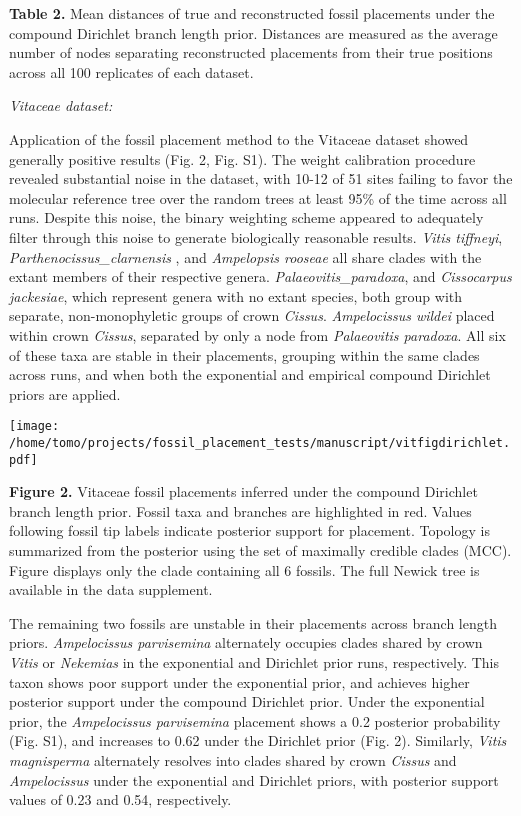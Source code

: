 \documentclass[12pt]{article}
\begin{document}
\textbf{Table 2.} Mean distances of true and reconstructed fossil
placements under the compound Dirichlet branch length prior. Distances are measured as the average number of nodes
separating reconstructed placements from their true positions across all
100 replicates of each dataset.

\noindent\emph{Vitaceae dataset:}

Application of the fossil placement method to the Vitaceae dataset
showed generally positive results (Fig. 2, Fig. S1). The weight calibration procedure
revealed substantial noise in the dataset, with 10-12 of 51 sites
failing to favor the molecular reference tree over the random trees at
least 95\% of the time across all runs. Despite this noise, the binary
weighting scheme appeared to adequately filter through this noise to
generate biologically reasonable results. \emph{Vitis tiffneyi},
\emph{Parthenocissus\_clarnensis} , and \emph{Ampelopsis rooseae} all
share clades with the extant members of their respective genera.
\emph{Palaeovitis\_paradoxa}, and \emph{Cissocarpus jackesiae}, which
represent genera with no extant species, both group with
separate, non-monophyletic groups of crown \emph{Cissus}.
\emph{Ampelocissus wildei} placed within crown
\emph{Cissus}, separated by only a node from \emph{Palaeovitis
paradoxa}. All six of these taxa are stable in their placements,
grouping within the same clades across runs, and when both the
exponential and empirical compound Dirichlet priors are applied.

\texttt{[image: /home/tomo/projects/fossil\_placement\_tests/manuscript/vitfigdirichlet.pdf]}

\textbf{Figure 2.}  Vitaceae fossil placements inferred
under the compound Dirichlet branch length prior. Fossil taxa and
branches are highlighted in red. Values following fossil tip labels
indicate posterior support for placement. Topology is summarized from
the posterior using the set of maximally credible clades (MCC). 
Figure displays only the clade containing all 6 fossils. The full Newick tree is available in the data supplement.

The remaining two fossils are  unstable in their
placements across branch length priors. \emph{Ampelocissus parvisemina}
alternately occupies  clades shared by crown \emph{Vitis} or
\emph{Nekemias} in the  exponential and Dirichlet prior runs,
respectively. This taxon shows poor support under the exponential prior, and achieves 
higher posterior support under the compound Dirichlet prior.
 Under the exponential prior, the \emph{Ampelocissus parvisemina} placement shows a 0.2
posterior probability (Fig. S1), and increases  to 0.62 under the Dirichlet
prior (Fig. 2). Similarly, \emph{Vitis magnisperma} alternately resolves into
clades shared by crown \emph{Cissus} and \emph{Ampelocissus} under the
exponential and Dirichlet priors, with posterior support values of 0.23
and 0.54, respectively. 
\end{document}
